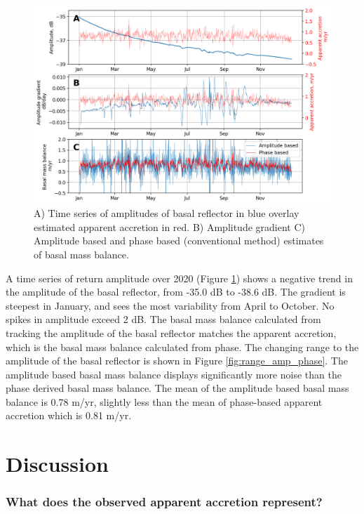 \begin{figure}[!ht]
\centering
\includegraphics[width=1\textwidth]{chapters/3/amplitudes.png}
\caption[Amplitude time series]{A) Time series of amplitudes of basal reflector in blue overlay estimated apparent accretion in red. B) Amplitude gradient C) Amplitude based and phase based (conventional method) estimates of basal mass balance.
}
\label{fig:amplitudes}
\end{figure}
A time series of return amplitude over 2020 (Figure \ref{fig:amplitudes}) shows a negative trend in the amplitude of the basal reflector, from -35.0 dB to -38.6 dB. 
The gradient is steepest in January, and sees the most variability from April to October. No spikes in amplitude exceed 2 dB.
The basal mass balance calculated from tracking the amplitude of the basal reflector matches the apparent accretion, which is the basal mass balance calculated from phase. The changing range to the amplitude of the basal reflector is shown in 
Figure \ref{fig:range_amp_phase}. The amplitude based  basal mass balance displays significantly more noise than the phase derived basal mass balance. The mean of the amplitude based  basal mass balance is 0.78 m/yr, slightly less than the mean of phase-based apparent accretion which is 0.81 m/yr.

\newpage

\section{Discussion} \label{sec:apres_discussion}

\subsubsection{What does the observed apparent accretion represent?}

